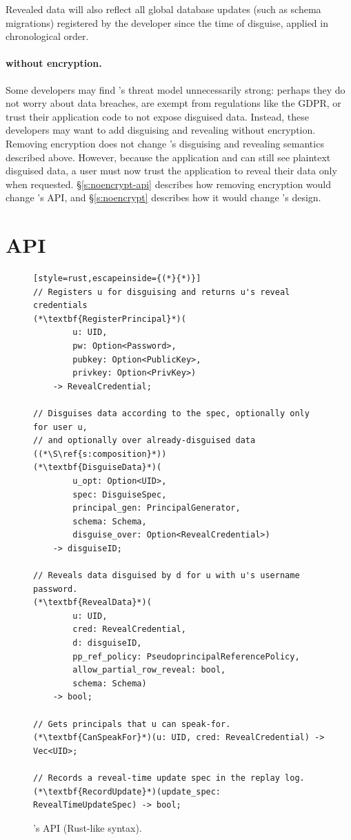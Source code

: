Revealed data will also reflect all global database updates (such as schema
migrations) registered by the developer since the time of disguise, applied in
chronological order.


\paragraph{\sys without encryption.}
\label{s:semantics:noencrypt}

Some developers may find \sys's threat model unnecessarily strong: perhaps they do
not worry about data breaches, are exempt from regulations like the GDPR, or
trust their application code to not expose disguised data. Instead, these
developers may want to add disguising and revealing without encryption.
%
Removing encryption does not change \sys's disguising and revealing semantics
described above.
However, because the application and \sys can still see plaintext disguised
data, a user must now trust the application to reveal their data only when 
requested. 
%
\S\ref{s:noencrypt-api} describes how removing encryption would change \sys's
API, and \S\ref{s:noencrypt} describes how it would change
\sys's design.


\section{API}
\label{s:api}

\begin{figure}[t]
\begin{lstlisting}[style=rust,escapeinside={(*}{*)}]
// Registers u for disguising and returns u's reveal credentials 
(*\textbf{RegisterPrincipal}*)(
        u: UID, 
        pw: Option<Password>,
        pubkey: Option<PublicKey>, 
        privkey: Option<PrivKey>)
    -> RevealCredential;

// Disguises data according to the spec, optionally only for user u, 
// and optionally over already-disguised data ((*\S\ref{s:composition}*))
(*\textbf{DisguiseData}*)(
        u_opt: Option<UID>, 
        spec: DisguiseSpec,
        principal_gen: PrincipalGenerator,
        schema: Schema,
        disguise_over: Option<RevealCredential>) 
    -> disguiseID;

// Reveals data disguised by d for u with u's username password. 
(*\textbf{RevealData}*)(
        u: UID, 
        cred: RevealCredential,
        d: disguiseID, 
        pp_ref_policy: PseudoprincipalReferencePolicy,
        allow_partial_row_reveal: bool,
        schema: Schema)
    -> bool;

// Gets principals that u can speak-for.
(*\textbf{CanSpeakFor}*)(u: UID, cred: RevealCredential) -> Vec<UID>;

// Records a reveal-time update spec in the replay log.
(*\textbf{RecordUpdate}*)(update_spec: RevealTimeUpdateSpec) -> bool;
\end{lstlisting}
\caption{\sys's API (Rust-like syntax).}
\label{f:api-high}
\end{figure}
%

